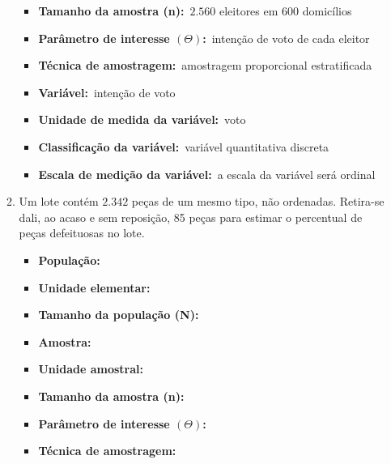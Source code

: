 \begin{enumerate}[label=\emph{\arabic*})]
\begin{enumerate}[label=\emph{\alph*})]
\begin{itemize}
			            \item \textbf{Tamanho da amostra (n):}~$2.560$ eleitores em 600 domicílios

			            \item \textbf{Parâmetro de interesse $\left(\varTheta\right)$:}~intenção de voto de cada eleitor

			            \item \textbf{Técnica de amostragem:}~amostragem proporcional estratificada

			            \item \textbf{Variável:}~intenção de voto

			            \item \textbf{Unidade de medida da variável:}~voto

			            \item \textbf{Classificação da variável:}~variável quantitativa discreta

			            \item \textbf{Escala de medição da variável:}~a escala da variável será ordinal
		            \end{itemize}

		      \item Um lote contém $2.342$ peças de um mesmo tipo, não ordenadas. Retira-se dali, ao
		            acaso e sem reposição, 85 peças para estimar o percentual de peças defeituosas no
		            lote.

		            \begin{itemize}
			            \item \textbf{População:}~

			            \item \textbf{Unidade elementar:}~

			            \item \textbf{Tamanho da população (N):}~

			            \item \textbf{Amostra:}~

			            \item \textbf{Unidade amostral:}~

			            \item \textbf{Tamanho da amostra (n):}~

			            \item \textbf{Parâmetro de interesse $\left(\varTheta\right)$:}~

			            \item \textbf{Técnica de amostragem:}~


\end{itemize}
\end{enumerate}
\end{enumerate}
